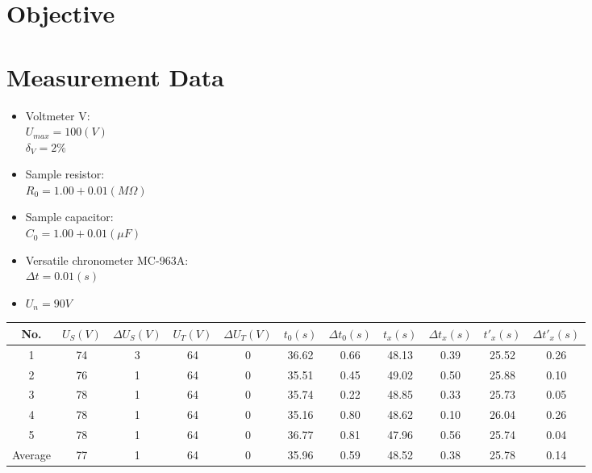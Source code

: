 \documentclass[12pt, a4paper]{article}
\newcommand{\Dt}{\Delta}
\newcommand{\hi}{\section}
\begin{document}
\pagebreak

\hi{Objective}

\hi{Measurement Data}
    \begin{itemize}
        \item Voltmeter V: \\
            $U_{max} = 100 (V)$ \\
            $\delta_{V} = 2 \%$
        \item Sample resistor: \\
            $R_{0} = 1.00 + 0.01 (M\Omega)$
        \item Sample capacitor: \\
            $C_{0} = 1.00 + 0.01 (\mu F)$
        \item Versatile chronometer MC-963A: \\
            $\Dt t = 0.01 (s)$
        \item $U_{n} = 90V$
    \end{itemize}

\begin{tabular}{|c|c|c|c|c|c|c|c|c|c|c|}
	\hline 
	No. & $U_{S} (V)$ & $\Dt U_{S} (V)$ & $U_{T} (V)$ & $\Dt U_{T} (V)$ & $t_{0} (s)$ & $\Dt t_{0} (s)$ & $t_{x} (s)$ & $\Dt t_{x} (s)$ & $t'_{x} (s)$ & $\Dt t'_{x} (s)$ \\ 
	\hline 
	1 & 74 & 3 & 64 & 0 & 36.62 & 0.66 & 48.13 & 0.39 & 25.52 & 0.26 \\ 
	\hline 
	2 & 76 & 1 & 64 & 0 & 35.51 & 0.45 & 49.02 & 0.50 & 25.88 & 0.10 \\ 
	\hline 
	3 & 78 & 1 & 64 & 0 & 35.74 & 0.22 & 48.85 & 0.33 & 25.73 & 0.05 \\ 
	\hline 
	4 & 78 & 1 & 64 & 0 & 35.16 & 0.80 & 48.62 & 0.10 & 26.04 & 0.26 \\ 
	\hline 
	5 & 78 & 1 & 64 & 0 & 36.77 & 0.81 & 47.96 & 0.56 & 25.74 & 0.04 \\ 
	\hline 
	Average & 77 & 1 & 64 & 0 & 35.96 & 0.59 & 48.52 & 0.38 & 25.78 & 0.14 \\ 
	\hline 
\end{tabular} 
\end{document}
